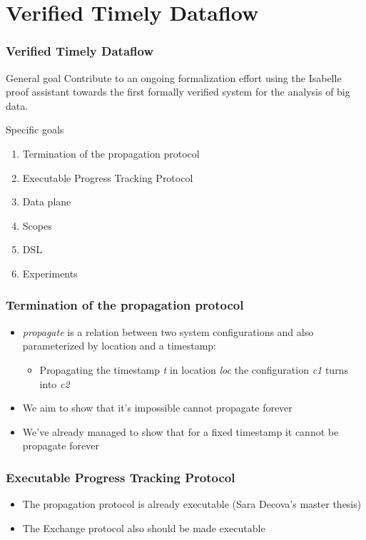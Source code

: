 \documentclass{beamer}
\begin{document}
\section{Verified Timely Dataflow}

\begin{frame}
  \frametitle{Verified Timely Dataflow}
  \begin{block}{General goal}
    Contribute to an ongoing formalization effort using the Isabelle proof assistant towards the first formally verified system for the analysis of big data.
  \end{block}
  \pause
  \begin{block}{Specific goals}
    \begin{enumerate}
      \item Termination of the propagation protocol
      \item Executable Progress Tracking Protocol
      \item Data plane
      \item Scopes
      \item DSL
      \item Experiments
    \end{enumerate}
  \end{block}
\end{frame}

\begin{frame}
  \frametitle{Termination of the propagation protocol}
  \begin{itemize}
    \item \textit{propagate} is a relation between two system configurations and also parameterized by location and a timestamp:
          \begin{itemize}
            \item Propagating the timestamp \textit{t} in location \textit{loc} the configuration \textit{c1} turns into \textit{c2}
          \end{itemize}
    \item We aim to show that it's impossible cannot propagate forever
    \item We've already managed to show that for a fixed timestamp it cannot be propagate forever
  \end{itemize}
\end{frame}

\begin{frame}
  \frametitle{Executable Progress Tracking Protocol}
  \begin{itemize}
    \item The propagation protocol is already executable (Sara Decova's master thesis)
    \item The Exchange protocol also should be made executable
  \end{itemize}
\end{frame}
\end{document}

